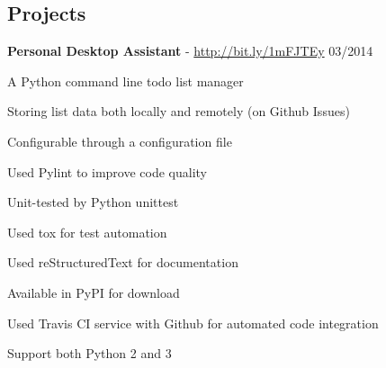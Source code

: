 \documentclass[margin,line]{resume}
\begin{document}
\begin{resume}
    \section{\mysidestyle Projects}




    \textbf{Personal Desktop Assistant} - \url{http://bit.ly/1mFJTEy} \hfill 03/2014 \vspace{-3mm}\\\vspace{-1mm}%
      \begin{list2}
       \item A Python command line todo list manager
       \item Storing list data both locally and remotely (on Github Issues)
       \item Configurable through a configuration file
       \item Used Pylint to improve code quality
       \item Unit-tested by Python unittest
       \item Used tox for test automation
       \item Used reStructuredText for documentation
       \item Available in PyPI for download
       \item Used Travis CI service with Github for automated code integration
       \item Support both Python 2 and 3
      \end{list2}


\end{resume}
\end{document}
